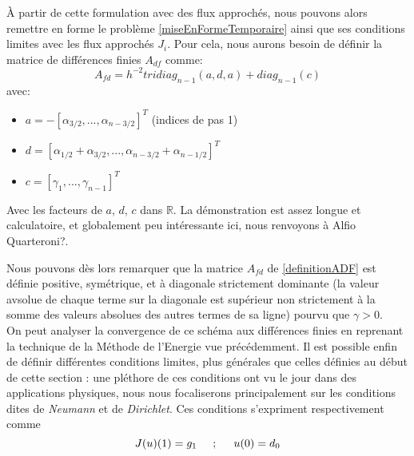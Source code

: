 \documentclass[12pt]{article}
\newcommand{\R}{\mathbb R}
\newcommand{\espace}{\hspace{5mm}}
\begin{document}
À partir de cette formulation avec des flux approchés, nous pouvons alors remettre en forme le problème \eqref{miseEnFormeTemporaire} ainsi que ses conditions limites avec les flux approchés $J_i$. Pour cela, nous aurons besoin de définir la matrice de différences finies $A_{df}$ comme:
\begin{equation} \label{definitionADF}
A_{fd} = h^{-2} tridiag_{n-1} (a,d,a) + diag_{n-1}(c)
\end{equation}
avec:
\begin{itemize}
  \item $a = -[\alpha_{3/2}, ..., \alpha_{n-3/2}]^T$ (indices de pas 1)
  \item $d = [\alpha_{1/2}+\alpha_{3/2}, ..., \alpha_{n-3/2} +\alpha_{n-1/2}]^T$
  \item $c = [\gamma_1, ..., \gamma_{n-1}]^T$
\end{itemize}
Avec les facteurs de $a$, $d$, $c$ dans $\R$. La démonstration est assez longue et calculatoire, et globalement peu intéressante ici, nous renvoyons à Alfio Quarteroni?.

Nous pouvons dès lors remarquer que la matrice $A_{fd}$ de \eqref{definitionADF} est définie positive, symétrique, et à diagonale strictement dominante (la valeur avsolue de chaque terme sur la diagonale est supérieur non strictement à la somme des valeurs absolues des autres termes de sa ligne) pourvu que $\gamma > 0$.\\
\quad On peut analyser la convergence de ce schéma aux différences finies en reprenant la technique de la Méthode de l'Energie vue précédemment.
Il est possible enfin de définir différentes conditions limites, plus générales que celles définies au début de cette section : une pléthore de ces conditions ont vu le jour dans des applications physiques, nous nous focaliserons principalement sur les conditions dites de \emph{Neumann} et de \emph{Dirichlet}. Ces conditions s'expriment respectivement comme
\begin{equation} \label{limitesNeumannDirichlet}
J(u)(1) = g_1 \espace ; \espace u(0) = d_0
\end{equation}
\end{document}
